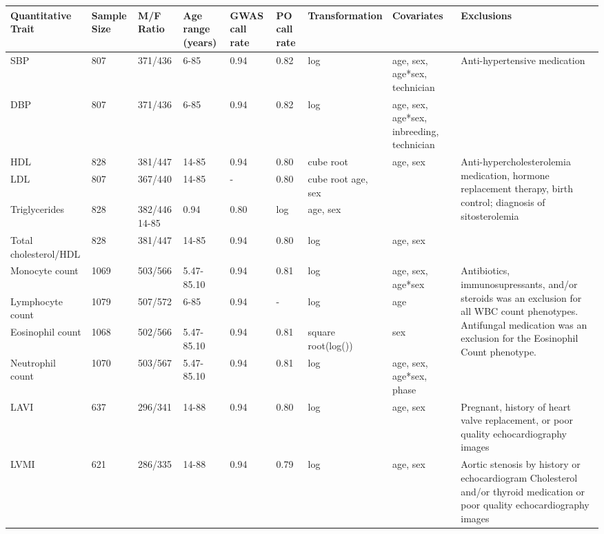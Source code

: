 \begin{landscape}

\begin{table}
\centering
\begin{adjustbox}{width={\textwidth}}
\begin{tabular}{@{}p{2.5cm}|p{1cm}p{2cm}p{2cm}p{1cm}p{1cm}p{4cm}p{3cm}|p{5cm}@{}}
\toprule Quantitative Trait & Sample Size & M/F Ratio & Age range (years) & GWAS call rate & PO call rate & Transformation & Covariates & Exclusions\\ \midrule
SBP & 807 & 	371/436 & 	6-85 & 	0.94 & 	0.82 & 	log & 	age, sex, age*sex, technician & \multirow{2}{5cm}{Anti-hypertensive medication} \\ \cline{1-8}
DBP & 807 & 	371/436 & 	6-85 & 	0.94 & 	0.82 & 	log & 	age, sex, age*sex, inbreeding, technician	 & \\ \hline
HDL & 828 & 	381/447 & 	14-85 & 	0.94 & 	0.80 & 	cube root & 	age, sex	& \multirow{4}{5cm}{Anti-hypercholesterolemia medication, hormone replacement therapy, birth control; diagnosis of sitosterolemia} \\ \cline{1-8}
LDL & 807 & 	367/440 & 	14-85 & 	- &	0.80 & 	cube root	age, sex	& \\ \cline{1-8}
Triglycerides & 828 & 382/446	14-85 & 	0.94	&0.80	&log	&age, sex	& \\ \cline{1-8}
Total cholesterol/HDL&	828 & 381/447&	14-85&	0.94&	0.80	&log	&age, sex	& \\ \hline
Monocyte count & 1069&	503/566&	5.47-85.10	&0.94&	0.81&	log&	age, sex, age*sex & \multirow{4}{5cm}{Antibiotics, immunosupressants, and/or steroids was an exclusion for all WBC count phenotypes. Antifungal medication was an exclusion for the Eosinophil Count phenotype.}\\ \cline{1-8}
Lymphocyte count & 1079 & 	507/572	&6-85 & 	0.94	 & - &	log	 & age	 & \\ \cline{1-8}
Eosinophil count & 1068 & 	502/566 & 	5.47-85.10	 & 0.94	 & 0.81	 & square root(log()) & 	sex	 & \\ \cline{1-8}
Neutrophil count & 1070 & 	503/567 & 	5.47-85.10 & 	0.94	 & 0.81	 & log	 & age, sex, age*sex, phase	 & \\ \cline{1-8}
LAVI & 637 & 	296/341 & 	14-88 & 	0.94 & 	0.80	 & log & 	age, sex & 	Pregnant, history of heart valve replacement, or poor quality echocardiography images \\ \hline
LVMI	 & 621 & 	286/335 & 	14-88 & 	0.94	 & 0.79 & 	log	 & age, sex	 & Aortic stenosis by history or echocardiogram Cholesterol and/or thyroid medication or poor quality echocardiography images \\ \hline

\end{tabular}
\end{adjustbox}
\end{table}
\end{landscape}
